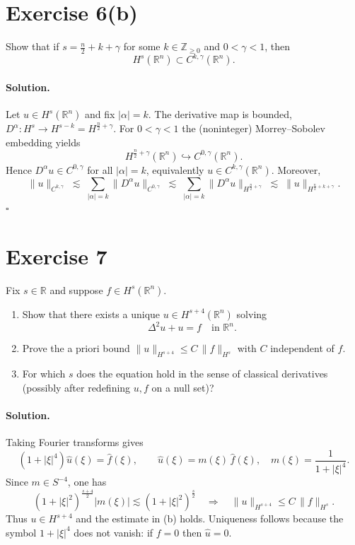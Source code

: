 \documentclass[12pt,a4paper]{article}
\newcommand{\qed}{\hfill$\square$}
\theoremstyle{plain}
\theoremstyle{definition}
\theoremstyle{remark}
\theoremstyle{remark}
\begin{document}
\clearpage

\section*{Exercise 6(b)}
Show that if $s=\frac n2+k+\gamma$ for some $k\in\mathbb Z_{\ge0}$ and $0<\gamma<1$, then
\[
H^s(\mathbb R^n)\subset C^{k,\gamma}(\mathbb R^n).
\]

\paragraph{Solution.}
Let $u\in H^s(\mathbb R^n)$ and fix $|\alpha|=k$. The derivative map is bounded,
$D^\alpha:H^s\to H^{s-k}=H^{\frac n2+\gamma}$. For $0<\gamma<1$ the (noninteger) Morrey–Sobolev embedding yields
\[
H^{\frac n2+\gamma}(\mathbb R^n)\hookrightarrow C^{0,\gamma}(\mathbb R^n).
\]
Hence $D^\alpha u\in C^{0,\gamma}$ for all $|\alpha|=k$, equivalently $u\in C^{k,\gamma}(\mathbb R^n)$.
Moreover,
\[
\|u\|_{C^{k,\gamma}}\;\lesssim\;\sum_{|\alpha|=k}\|D^\alpha u\|_{C^{0,\gamma}}
\;\lesssim\;\sum_{|\alpha|=k}\|D^\alpha u\|_{H^{\frac n2+\gamma}}
\;\lesssim\;\|u\|_{H^{\frac n2+k+\gamma}}.
\]
\qed

\bigskip
\bigskip

\section*{Exercise 7}
Fix $s\in\mathbb R$ and suppose $f\in H^s(\mathbb R^n)$.
\begin{enumerate}\itemsep4pt
	\item[(a)] Show that there exists a unique $u\in H^{s+4}(\mathbb R^n)$ solving
	\[
	\Delta^2 u + u = f \quad\text{in }\mathbb R^n.
	\]
	\item[(b)] Prove the a priori bound $\|u\|_{H^{s+4}}\le C\,\|f\|_{H^s}$ with $C$ independent of $f$.
	\item[(c)] For which $s$ does the equation hold in the sense of classical derivatives (possibly after redefining $u,f$ on a null set)?
\end{enumerate}

\paragraph{Solution.}
Taking Fourier transforms gives
\[
(1+|\xi|^4)\widehat u(\xi)=\widehat f(\xi),\qquad
\widehat u(\xi)=m(\xi)\,\widehat f(\xi),\quad m(\xi)=\frac{1}{1+|\xi|^4}.
\]
Since $m\in S^{-4}$, one has
\[
(1+|\xi|^2)^{\frac{s+4}{2}}|m(\xi)| \lesssim (1+|\xi|^2)^{\frac{s}{2}}
\quad\Rightarrow\quad
\|u\|_{H^{s+4}}\le C\,\|f\|_{H^s}.
\]
Thus $u\in H^{s+4}$ and the estimate in (b) holds. Uniqueness follows because the symbol $1+|\xi|^4$ does not vanish:
if $f=0$ then $\widehat u=0$.
\end{document}
